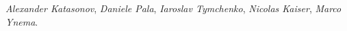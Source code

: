 \emph{Alexander Katasonov},
\emph{Daniele Pala},
\emph{Iaroslav Tymchenko},
\emph{Nicolas Kaiser},
\emph{Marco Ynema}.
